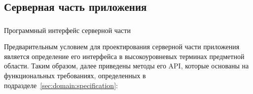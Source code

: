 \subsection{Серверная часть приложения}
\label{sec:design:server}

\subsubsection{} Программный интерфейс серверной части
\label{sec:design:server:interface}

Предварительным условием для проектирования серверной части приложения является определение его интерфейса в высокоуровневых терминах предметной области. Таким образом, далее приведены методы его API, которые основаны на функциональных требованиях, определенных в подразделе~\ref{sec:domain:specification}:

